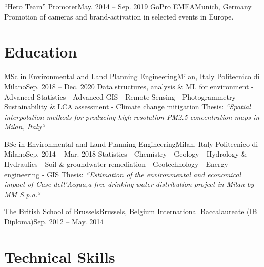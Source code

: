 \documentclass[letterpaper,11pt]{article}
\begin{document}
\sectionElement
{“Hero Team” Promoter}{May. 2014 -- Sep. 2019}
{GoPro EMEA}{Munich, Germany}
{Promotion of cameras and brand-activation in selected events in Europe.}
{}
\sectionElementListEnd


\section{Education}
\sectionElementListStart

\sectionElement
{MSc in Environmental and Land Planning Engineering}{Milan, Italy}
{Politecnico di Milano}{Sep. 2018 -- Dec. 2020}
{\scriptsize Data structures, analysis \& ML for environment - Advanced Statistics - Advanced GIS -
  Remote Sensing - Photogrammetry -
  Sustainability \& LCA assessment - Climate change mitigation\newline
  {\scriptsize Thesis: \it “Spatial interpolation methods for producing high-resolution PM2.5 concentration maps in Milan, Italy“}}
{}

\sectionElement
{BSc in Environmental and Land Planning Engineering}{Milan, Italy}
{Politecnico di Milano}{Sep. 2014 -- Mar. 2018}
{\scriptsize Statistics - Chemistry - Geology - Hydrology \& Hydraulics
  - Soil \& groundwater remediation - Geotechnology - Energy engineering - GIS\newline
  {\scriptsize Thesis: \it “Estimation of the environmental and economical impact of Case dell'Acqua,a free drinking-water distribution project in Milan by MM S.p.a.“}}
{}

\sectionElement
{The British School of Brussels}{Brussels, Belgium}
{International Baccalaureate (IB Diploma)}{Sep. 2012 -- May. 2014}
{}{}

\sectionElementListEnd

\section{Technical Skills}
\skillsListStart
{}
\skillsListEnd
\end{document}
